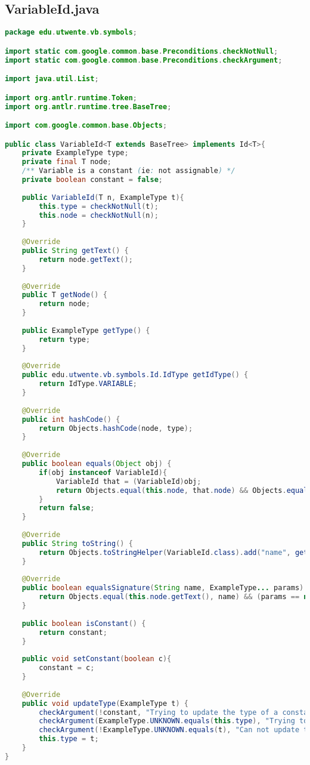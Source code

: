 \subsection{VariableId.java}
\begin{lstlisting}[language=Java]
package edu.utwente.vb.symbols;

import static com.google.common.base.Preconditions.checkNotNull;
import static com.google.common.base.Preconditions.checkArgument;

import java.util.List;

import org.antlr.runtime.Token;
import org.antlr.runtime.tree.BaseTree;

import com.google.common.base.Objects;

public class VariableId<T extends BaseTree> implements Id<T>{
	private ExampleType type;
	private final T node;
	/** Variable is a constant (ie: not assignable) */
	private boolean constant = false;
	
	public VariableId(T n, ExampleType t){
		this.type =	checkNotNull(t);
		this.node = checkNotNull(n);
	}
	
	@Override
	public String getText() {
		return node.getText();
	}
	
	@Override
	public T getNode() {
		return node;
	}
	
	public ExampleType getType() {
		return type;
	}
	
	@Override
	public edu.utwente.vb.symbols.Id.IdType getIdType() {
		return IdType.VARIABLE;
	}
	
	@Override
	public int hashCode() {
		return Objects.hashCode(node, type);
	}
	
	@Override
	public boolean equals(Object obj) {
		if(obj instanceof VariableId){
			VariableId that = (VariableId)obj;
			return Objects.equal(this.node, that.node) && Objects.equal(this.type, that.type);
		}
		return false;
	}
	
	@Override
	public String toString() {
		return Objects.toStringHelper(VariableId.class).add("name", getText()).add("type",type).add("constant", constant).toString();
	}
	
	@Override
	public boolean equalsSignature(String name, ExampleType... params) {
		return Objects.equal(this.node.getText(), name) && (params == null || params.length == 0);
	}
	
	public boolean isConstant() {
		return constant;
	}
	
	public void setConstant(boolean c){
		constant = c;
	}
	
	@Override
	public void updateType(ExampleType t) {
		checkArgument(!constant, "Trying to update the type of a constant");
		checkArgument(ExampleType.UNKNOWN.equals(this.type), "Trying to update the type of a variable which is not Type.UNKNOWN");
		checkArgument(!ExampleType.UNKNOWN.equals(t), "Can not update to Type.UNKNOWN");
		this.type = t;
	}
}

\end{lstlisting}

